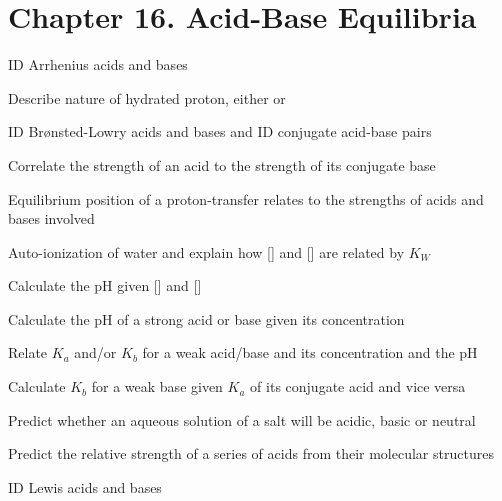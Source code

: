 \section{Chapter 16. Acid-Base Equilibria}


\secttoc

{\footnotesize
\begin{multicols}{3}
\begin{compactenum}
    \item ID Arrhenius acids and bases
    \item Describe nature of hydrated proton, either  or 
    \item ID Br{\o}nsted-Lowry acids and bases and ID conjugate acid-base pairs
    \item Correlate the strength of an acid to the strength of its conjugate
        base
    \item Equilibrium position of a proton-transfer relates to the strengths of
        acids and bases involved
    \item Auto-ionization of water and explain how [] and [] are
        related by $K_W$
    \item Calculate the pH given [] and []
    \item Calculate the pH of a strong acid or base given its concentration
    \item Relate $K_a$ and/or $K_b$ for a weak acid/base and its concentration
        and the pH
    \item Calculate $K_b$ for a weak base given $K_a$ of its conjugate acid and
        vice versa
    \item Predict whether an aqueous solution of a salt will be acidic, basic
        or neutral
    \item Predict the relative strength of a series of acids from their
        molecular structures
    \item ID Lewis acids and bases

\end{compactenum}
\end{multicols}
}


